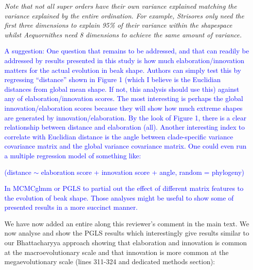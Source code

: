 \documentclass[12pt,letterpaper]{article}
\begin{document}
{\noindent\textit{Note that not all super orders have their own variance explained matching the variance explained by the entire ordination. For example, Strisores only need the first three dimensions to explain 95\% of their variance within the shapespace whilst Aequornithes need 8 dimensions to achieve the same amount of variance.}

\textcolor{blue}{A suggestion: One question that remains to be addressed, and that can readily be addressed by results presented in this study is how much elaboration/innovation matters for the actual evolution in beak shape. Authors can simply test this by regressing “distance” shown in Figure 1 (which I believe is the Euclidian distances from global mean shape. If not, this analysis should use this) against any of elaboration/innovation scores. The most interesting is perhaps the global innovation/elaboration scores because they will show how much extreme shapes are generated by innovation/elaboration. By the look of Figure 1, there is a clear relationship between distance and elaboration (all). Another interesting index to correlate with Euclidian distance is the angle between clade-specific variance covariance matrix and the global variance covariance matrix. One could even run a multiple regression model of something like:}

\textcolor{blue}{(distance $\sim$ elaboration score + innovation score + angle, random = phylogeny)}

\textcolor{blue}{In MCMCglmm or PGLS to partial out the effect of different matrix features to the evolution of beak shape. Those analyses might be useful to show some of presented results in a more succinct manner.}

We have now added an entire along this reviewer’s comment in the main text. We now analyse and show the PGLS results which interestingly give results similar to our Bhattacharyya approach showing that elaboration and innovation is common at the macroevolutionary scale and that innovation is more common at the megaevolutionary scale (lines 311-324 and dedicated methods section):

}
\end{document}
